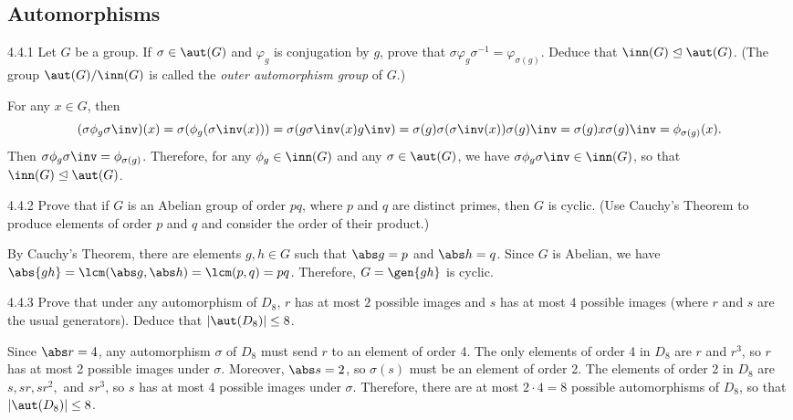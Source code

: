\subsection{Automorphisms}

\begin{spex}{4.4.1}
	Let $G$ be a group.
	If $\sigma \in \aut(G)$ and $\varphi_g$ is conjugation by $g$, prove that $\sigma \varphi_g \sigma^{-1} = \varphi_{\sigma(g)}$.
	Deduce that $\inn(G) \trianglelefteq \aut(G)$. (The group $\aut(G)/\inn(G)$ is called the \emph{outer automorphism group} of $G$.)
\end{spex}

\begin{sol}[spsol]
	For any $x \in G$, then
	\[
		(\sigma\phi_g\sigma\inv)(x) = \sigma(\phi_g(\sigma\inv(x))) = \sigma(g\sigma\inv(x)g\inv) = \sigma(g)\sigma(\sigma\inv(x))\sigma(g)\inv = \sigma(g)x\sigma(g)\inv = \phi_{\sigma(g)}(x).
	\]
	Then $\sigma\phi_g\sigma\inv = \phi_{\sigma(g)}$.
	Therefore, for any $\phi_g \in \inn(G)$ and any $\sigma \in \aut(G)$, we have $\sigma\phi_g\sigma\inv \in \inn(G)$, so that $\inn(G) \trianglelefteq \aut(G)$.
\end{sol}

\begin{spex}{4.4.2}
	Prove that if $G$ is an Abelian group of order $pq$, where $p$ and $q$ are distinct primes, then $G$ is cyclic. (Use Cauchy's Theorem to produce elements of order $p$ and $q$ and consider the order of their product.)
\end{spex}

\begin{sol}[spsol]
	By Cauchy's Theorem, there are elements $g, h \in G$ such that $\abs g = p$ and $\abs h = q$.
	Since $G$ is Abelian, we have $\abs{gh} = \lcm(\abs g, \abs h) = \lcm(p, q) = pq$.
	Therefore, $G = \gen{gh}$ is cyclic.
\end{sol}

\begin{exercise}{4.4.3}
	Prove that under any automorphism of $D_8$, $r$ has at most $2$ possible images and $s$ has at most $4$ possible images (where $r$ and $s$ are the usual generators).
	Deduce that $|\aut(D_8)| \le 8$.
\end{exercise}

\begin{sol}
	Since $\abs r = 4$, any automorphism $\sigma$ of $D_8$ must send $r$ to an element of order 4.
	The only elements of order 4 in $D_8$ are $r$ and $r^3$, so $r$ has at most 2 possible images under $\sigma$.
	Moreover, $\abs s = 2$, so $\sigma(s)$ must be an element of order 2.
	The elements of order 2 in $D_8$ are $s, sr, sr^2,$ and $sr^3$, so $s$ has at most 4 possible images under $\sigma$.
	Therefore, there are at most $2 \cdot 4 = 8$ possible automorphisms of $D_8$, so that $|\aut(D_8)| \leq 8$.
\end{sol}

